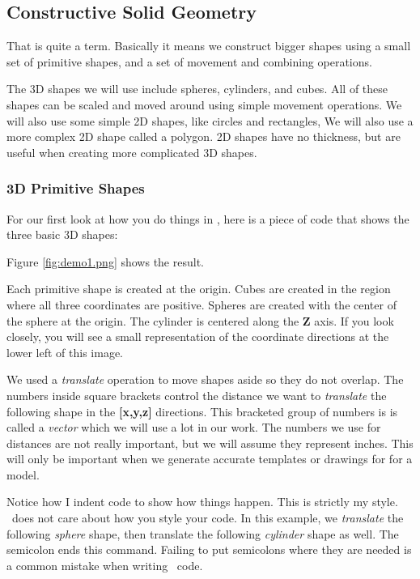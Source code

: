 \subsection{Constructive Solid Geometry}

That is quite a term. Basically it means we construct bigger shapes using a
small set of primitive shapes, and a set of movement and combining operations.

The 3D shapes we will use include spheres, cylinders, and cubes. All of these
shapes can be scaled and moved around using simple movement operations.  We
will also use some simple 2D shapes, like circles and rectangles, We will also
use a more complex 2D shape called a polygon.  2D shapes have no thickness, but
are useful when creating more complicated 3D shapes.

\subsubsection{3D Primitive Shapes}

For our first look at how you do things in \osc, here is a piece of code
that shows the three basic 3D shapes:


Figure \ref{fig:demo1.png} shows the result.


Each primitive shape is created at the origin. Cubes are created in the region
where all three coordinates are positive. Spheres are created with the center
of the sphere at the origin. The cylinder is centered along the {\bf Z} axis.
If you look closely, you will see a small representation of the coordinate
directions at the lower left of this image.

We used a {\it translate} operation to move shapes aside so they do not
overlap. The numbers inside square brackets control the distance we want to
{\it translate} the following shape in the {\bf [x,y,z]} directions. This
bracketed group of numbers is is called a {\it vector} which we will use a lot
in our work. The numbers we use for distances are not really important, but we
will assume they represent inches. This will only be important when we
generate accurate templates or drawings for for a model.

Notice how I indent code to show how things happen. This is strictly my style.
\osc\ does not care about how you style your code. In this example, we {\it
translate} the following {\it sphere} shape, then translate the following {\it
cylinder} shape as well. The semicolon ends this command.
Failing to put semicolons where they are needed is a common mistake when
writing \osc\ code.

